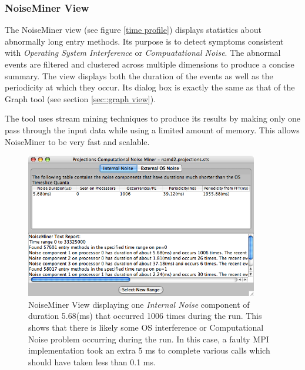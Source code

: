 
\subsubsection{NoiseMiner View}

The NoiseMiner view (see figure \ref{time profile}) displays statistics about abnormally long entry methods. Its purpose is to detect symptoms consistent with \textit{Operating System Interference} or \textit{Compuatational Noise}. The abnormal events are filtered and clustered across multiple dimensions to produce a concise summary. The view displays both the duration of the events as well as the periodicity at which they occur. Its dialog box is exactly the same as that of the Graph tool (see section \ref{sec::graph view}).

The tool uses stream mining techniques to produce its results by making only one pass through the input data while using a limited amount of memory. This allows NoiseMiner to be very fast and scalable. 

\begin{figure}[htb]
\center
\includegraphics[width=4.0in]{fig/noiseminer}
\caption{NoiseMiner View displaying one \textit{Internal Noise} component of duration 5.68(ms) that occurred 1006 times during the run. This shows that there is likely some OS interference or Computational Noise problem occurring during the run. In this case, a faulty MPI implementation took an extra 5 ms to complete various calls which should have taken less than 0.1 ms.}
\label{noiseminer}
\end{figure}

